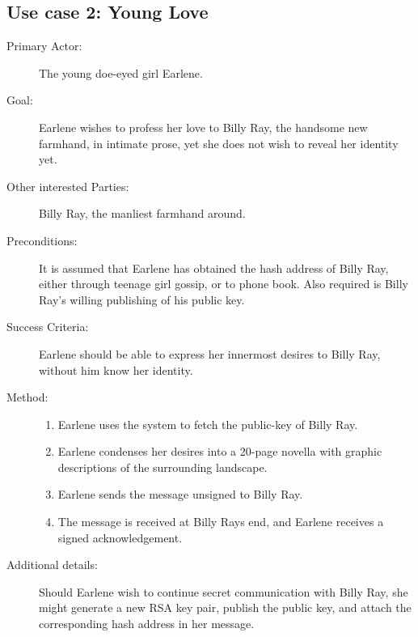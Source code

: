 \subsection{Use case 2: Young Love}
\begin{description}
\item[Primary Actor:] The young doe-eyed girl Earlene.
\item[Goal:] Earlene wishes to profess her love to Billy Ray, the handsome new farmhand, in intimate prose, yet she does not wish to reveal her identity yet. 
\item[Other interested Parties:] Billy Ray, the manliest farmhand around.
\item[Preconditions:] It is assumed that Earlene has obtained the hash address of Billy Ray, either through teenage girl gossip, or to phone book. Also required is Billy Ray's willing publishing of his public key.
\item[Success Criteria:] Earlene should be able to express her innermost desires to Billy Ray, without him know her identity.
\item[Method:]
\begin{enumerate}
\item Earlene uses the system to fetch the public-key of Billy Ray.
\item Earlene condenses her desires into a 20-page novella with graphic descriptions of the surrounding landscape.
\item Earlene sends the message unsigned to Billy Ray.
\item The message is received at Billy Rays end, and Earlene receives a signed acknowledgement.
\end{enumerate}
\item[Additional details:] Should Earlene wish to continue secret communication with Billy Ray, she might generate a new RSA key pair, publish the public key, and attach the corresponding hash address in her message.
\end{description}
